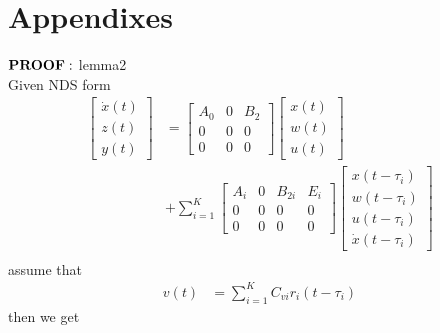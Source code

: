 \documentclass[twocolumn]{autart}    %
\begin{document}
\section{Appendixes}
$\bold{PROOF:}$ lemma2\\
Given NDS form
\begin{equation}
    \begin{aligned}
        \begin{bmatrix}
            \dot{x}(t) \\
            z(t) \\
            y(t) 
        \end{bmatrix} & = \begin{bmatrix}
            A_{0} & 0 & B_{2}\\
            0 & 0 & 0\\
            0 & 0 & 0
        \end{bmatrix}\begin{bmatrix}
            x(t) \\
            w(t) \\
            u(t) 
        \end{bmatrix} \\ 
        &+ \sum_{i=1}^{K}\begin{bmatrix}
            A_{i} & 0 & B_{2i} & E_{i}\\
            0 & 0 & 0 & 0\\
            0 & 0 & 0 & 0
        \end{bmatrix} \begin{bmatrix}
            x(t-\tau_{i}) \\
            w(t-\tau_{i}) \\
            u(t-\tau_{i}) \\
            \dot{x}(t-\tau_{i})
        \end{bmatrix}\\
    \end{aligned}
\end{equation}
assume that
\begin{equation}
    \begin{aligned}
        v(t) &= \sum_{i = 1}^{K}C_{vi}r_{i}(t-\tau_{i})
    \end{aligned}
\end{equation}
then we get
\end{document}
